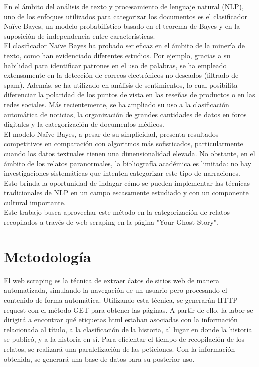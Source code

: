 \documentclass[12pt, letterpaper]{report}
\begin{document}
En el ámbito del análisis de texto y procesamiento de lenguaje natural (NLP), uno de los enfoques utilizados para categorizar los documentos es el clasificador Naïve Bayes, un modelo probabilístico basado en el teorema de Bayes y en la suposición de independencia entre características.
\\

El clasificador Naïve Bayes ha probado ser eficaz en el ámbito de la minería de texto, como han evidenciado diferentes estudios. Por ejemplo, gracias a su habilidad para identificar patrones en el uso de palabras, se ha empleado extensamente en la detección de correos electrónicos no deseados (filtrado de spam). Además, se ha utilizado en análisis de sentimientos, lo cual posibilita diferenciar la polaridad de los puntos de vista en las reseñas de productos o en las redes sociales. Más recientemente, se ha ampliado su uso a la clasificación automática de noticias, la organización de grandes cantidades de datos en foros digitales y la categorización de documentos médicos.
\\

El modelo Naïve Bayes, a pesar de su simplicidad, presenta resultados competitivos en comparación con algoritmos más sofisticados, particularmente cuando los datos textuales tienen una dimensionalidad elevada. No obstante, en el ámbito de los relatos paranormales, la bibliografía académica es limitada: no hay investigaciones sistemáticas que intenten categorizar este tipo de narraciones. Esto brinda la oportunidad de indagar cómo se pueden implementar las técnicas tradicionales de NLP en un campo escasamente estudiado y con un componente cultural importante.
\\

Este trabajo busca aprovechar este método en la categorización de relatos recopilados a través de web scraping  en la página "Your Ghost Story".

\section*{Metodología}

El web scraping es la técnica de extraer datos de sitios web de manera automatizada, simulando la navegación de un usuario pero procesando el contenido de forma automática.  Utilizando esta técnica, se generarán HTTP request con el método GET para obtener las páginas. A partir de ello, la labor se dirigirá a encontrar qué etiquetas html estaban asociadas con la información relacionada al título, a la clasificación de la historia, al lugar en donde la historia se publicó, y a la historia en sí. Para eficientar el tiempo de recopilación de los relatos, se realizará una paralelización de las peticiones. Con la información obtenida, se generará una base de datos para su posterior uso.
\\
\end{document}
